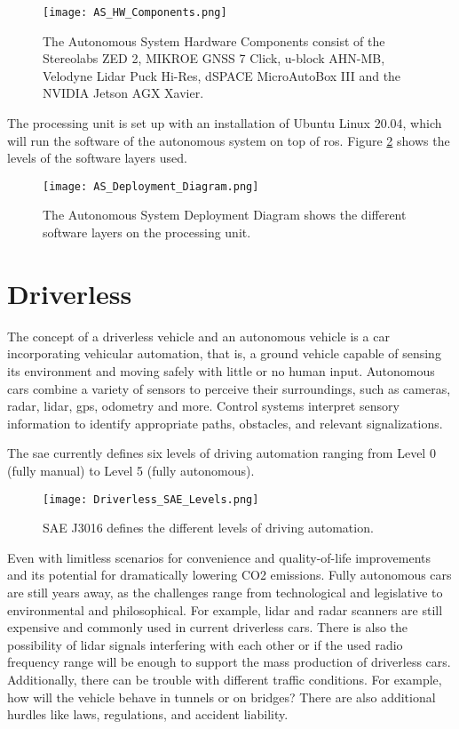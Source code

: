 \begin{figure}[H]
    \centering
    \texttt{[image: AS\_HW\_Components.png]}
    \caption{The Autonomous System Hardware Components consist of the Stereolabs ZED 2, MIKROE GNSS 7 Click, u-block AHN-MB, Velodyne Lidar Puck Hi-Res, dSPACE MicroAutoBox III and the NVIDIA Jetson AGX Xavier.}
    \label{fig:AS HW Components}
\end{figure}

The processing unit is set up with an installation of Ubuntu Linux 20.04, which will run the software of the autonomous system on top of \acrshort{ros}. Figure \ref{fig:AS Deployment Diagram} shows the levels of the software layers used.

\begin{figure}[H]
    \centering
    \texttt{[image: AS\_Deployment\_Diagram.png]}
    \caption{The Autonomous System Deployment Diagram shows the different software layers on the processing unit.}
    \label{fig:AS Deployment Diagram}
\end{figure}

\section{Driverless} \label{sec:Driverless}
The concept of a driverless vehicle and an autonomous vehicle is a car incorporating vehicular automation, that is, a ground vehicle capable of sensing its environment and moving safely with little or no human input. \cite{driverless_cooperative_control}
Autonomous cars combine a variety of sensors to perceive their surroundings, such as cameras, radar, \gls{lidar}, \acrshort{gps}, \Gls{odometry} and more. Control systems interpret sensory information to identify appropriate paths, obstacles, and relevant signalizations. \cite{driverless_governing_autonomous_vehicles}

The \acrshort{sae} currently defines six levels of driving automation ranging from Level 0 (fully manual) to Level 5 (fully autonomous). \cite{driverless_sae_levels}
\begin{figure}[H]
    \centering
    \texttt{[image: Driverless\_SAE\_Levels.png]}
    \caption{SAE J3016 defines the different levels of driving automation.}
    \label{fig:Driverless SAE Levels}
\end{figure}

Even with limitless scenarios for convenience and quality-of-life improvements and its potential for dramatically lowering CO2 emissions. \cite{driverless_study_three_revolutions}
Fully autonomous cars are still years away, as the challenges range from technological and legislative to environmental and philosophical. For example, \gls{lidar} and radar scanners are still expensive and commonly used in current driverless cars. There is also the possibility of \gls{lidar} signals interfering with each other or if the used radio frequency range will be enough to support the mass production of driverless cars. Additionally, there can be trouble with different traffic conditions. For example, how will the vehicle behave in tunnels or on bridges? There are also additional hurdles like laws, regulations, and accident liability. \cite{driverless_what_is_an_autonomous_car}

